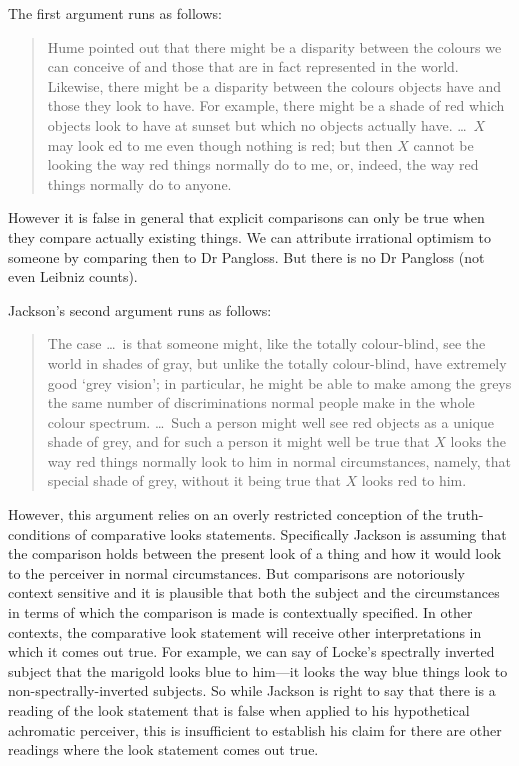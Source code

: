 \documentclass[12pt]{article}
\begin{document}
The first argument runs as follows:
\begin{quote}
	Hume pointed out that there might be a disparity between the colours we can conceive of and those that are in fact represented in the world. Likewise, there might be a disparity between the colours objects have and those they look to have. For example, there might be a shade of red which objects look to have at sunset but which no objects actually have. \ldots\ \( X \) may look ed to me even though nothing is red; but then \( X \) cannot be looking the way red things normally do to me, or, indeed, the way red things normally do to anyone. \citep[35]{Jackson:1977fk}
\end{quote}
However it is false in general that explicit comparisons can only be true when they compare actually existing things. We can attribute irrational optimism to someone by comparing then to Dr Pangloss. But there is no Dr Pangloss (not even Leibniz counts).

Jackson's second argument runs as follows:
\begin{quote}
	The case \ldots\ is that someone might, like the totally colour-blind, see the world in shades of gray, but unlike the totally colour-blind, have extremely good `grey vision'; in particular, he might be able to make among the greys the same number of discriminations normal people make in the whole colour spectrum. \ldots\ Such a person might well see red objects as a unique shade of grey, and for such a person it might well be true that \( X \) looks the way red things normally look to him in normal circumstances, namely, that special shade of grey, without it being true that \( X \) looks red to him. \citep[36]{Jackson:1977fk}
\end{quote}
However, this argument relies on an overly restricted conception of the truth-conditions of comparative looks statements. Specifically Jackson is assuming that the comparison holds between the present look of a thing and how it would look to the perceiver in normal circumstances. But comparisons are notoriously context sensitive and it is plausible that both the subject and the circumstances in terms of which the comparison is made is contextually specified. In other contexts, the comparative look statement will receive other interpretations in which it comes out true. For example, we can say of Locke's spectrally inverted subject that the marigold looks blue to him---it looks the way blue things look to non-spectrally-inverted subjects. So while Jackson is right to say that there is a reading of the look statement that is false when applied to his hypothetical achromatic perceiver, this is insufficient to establish his claim for there are other readings where the look statement comes out true.
\end{document}
